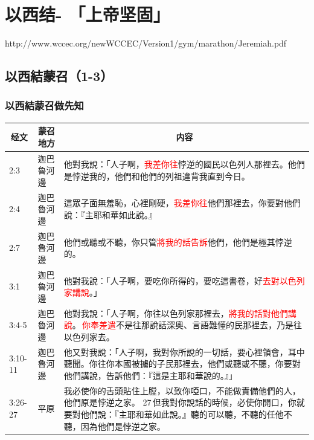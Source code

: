 \section{以西结- 「上帝坚固」}
http://www.wccec.org/newWCCEC/Version1/gym/marathon/Jeremiah.pdf
\subsection{以西結蒙召（1-3）}

\subsubsection{以西結蒙召做先知}
\begin{table}[H]
\centering
\begin{tabular}{p{1.2cm}|p{1.8cm}|p{}}\hline\hline
\multicolumn{1}{c|}{经文}&\multicolumn{1}{c|}{蒙召地方}&\multicolumn{1}{c}{内容}\\\hline

2:3&迦巴魯河邊&他對我說：「人子啊，\textcolor{red}{我差你往}悖逆的國民以色列人那裡去。他們是悖逆我的，他們和他們的列祖違背我直到今日。 \\\hline 
2:4&迦巴魯河邊&這眾子面無羞恥，心裡剛硬，\textcolor{red}{我差你往}他們那裡去，你要對他們說：『主耶和華如此說。』\\\hline 
2:7&迦巴魯河邊&他們或聽或不聽，你只管\textcolor{red}{將我的話告訴}他們，他們是極其悖逆的。\\\hline 
3:1&迦巴魯河邊&他對我說：「人子啊，要吃你所得的，要吃這書卷，好\textcolor{red}{去對以色列家講說}。」\\\hline 
3:4-5&迦巴魯河邊&他對我說：「人子啊，你往以色列家那裡去，\textcolor{red}{將我的話對他們講說}。 \textcolor{red}{你奉差遣}不是往那說話深奧、言語難懂的民那裡去，乃是往以色列家去。\\\hline
3:10-11&迦巴魯河邊&他又對我說：「人子啊，我對你所說的一切話，要心裡領會，耳中聽聞。你往你本國被擄的子民那裡去，他們或聽或不聽，你要對他們講說，告訴他們：『這是主耶和華說的。』」\\\hline
3:26-27&平原&我必使你的舌頭貼住上膛，以致你啞口，不能做責備他們的人，他們原是悖逆之家。 27 但我對你說話的時候，必使你開口，你就要對他們說：『主耶和華如此說。』聽的可以聽，不聽的任他不聽，因為他們是悖逆之家。\\\hline
\end{tabular}
\end{table}

